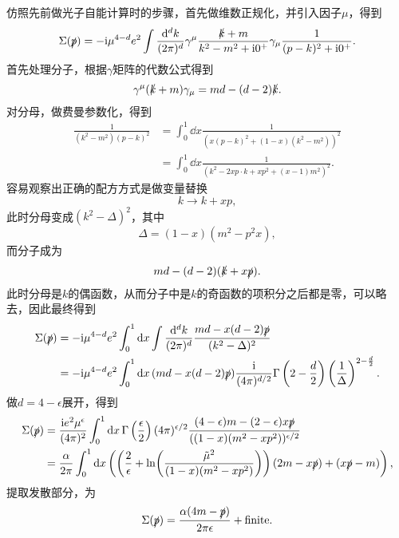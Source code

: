 仿照先前做光子自能计算时的步骤，首先做维数正规化，并引入因子$\mu$，得到
\begin{equation}
    \Sigma(\slashed{p}) = - \mathrm{i} \mu^{4-d}  e^2 \int \frac{\dd[d]{k}}{(2\pi)^d} \gamma^\mu \frac{\slashed{k} + m}{k^2 - m^2 + \mathrm{i} 0^+} \gamma_\mu \frac{1}{(p-k)^2 + \mathrm{i} 0^+}.
\end{equation}
首先处理分子，根据$\gamma$矩阵的代数公式得到
\[
    \gamma^\mu (\slashed{k} + m) \gamma_\mu = md - (d-2) \slashed{k}.
\]
对分母，做费曼参数化，得到
\[
    \begin{aligned}
        \frac{1}{(k^2 - m^2)(p - k)^2} &= \int_0^1 \dd{x} \frac{1}{(x (p-k)^2 + (1-x) (k^2 - m^2))^2} \\
        &= \int_0^1 \dd{x} \frac{1}{(k^2 - 2 x p \cdot k + x p^2 + (x-1) m^2)^2}.
    \end{aligned}
\]
容易观察出正确的配方方式是做变量替换
\[
    k \longrightarrow k + xp,
\]
此时分母变成$(k^2 - \Delta)^2$，其中
\[
    \Delta = (1 - x)(m^2 - p^2 x),
\]
而分子成为
\[
    md - (d-2)(\slashed{k} + x \slashed{p}).
\]
此时分母是$k$的偶函数，从而分子中是$k$的奇函数的项积分之后都是零，可以略去，因此最终得到
\begin{equation}
    \begin{aligned}
        \Sigma(\slashed{p}) &= - \mathrm{i} \mu^{4-d} e^2 \int_0^1 \dd{x} \int \frac{\dd[d]{k}}{(2\pi)^d} \frac{md - x (d-2) \slashed{p}}{(k^2 - \Delta)^2} \\
        &= - \mathrm{i} \mu^{4-d} e^2 \int_0^1 \dd{x} (md - x (d-2) \slashed{p}) \frac{\mathrm{i}}{(4\pi)^{d/2}} \Gamma\left(2 - \frac{d}{2} \right) \left(\frac{1}{\Delta}\right)^{2-\frac{d}{2}}. 
    \end{aligned}
\end{equation}
做$d = 4 - \epsilon$展开，得到
\begin{equation}
    \begin{aligned}
        \Sigma(\slashed{p}) &= \frac{\mathrm{i} e^2 \mu^\epsilon}{(4\pi)^2} \int_0^1 \dd{x} \Gamma\left(\frac{\epsilon}{2}\right) (4\pi)^{\epsilon/2} \frac{(4-\epsilon) m - (2-\epsilon) x \slashed{p}}{((1-x) (m^2 - x p^2))^{\epsilon/2}} \\
        &= \frac{\alpha}{2\pi} \int_0^1 \dd{x} \left( \left( \frac{2}{\epsilon} + \ln(\frac{\tilde{\mu}^2}{(1-x) (m^2 - xp^2)}) \right) (2 m - x \slashed{p}) + (x \slashed{p} - m) \right),
    \end{aligned}
\end{equation}
提取发散部分，为
\begin{equation}
    \Sigma(\slashed{p}) = \frac{\alpha (4m - \slashed{p})}{2 \pi \epsilon} + \text{finite}.
    \label{eq:electron-one-loop-divergence}
\end{equation}

